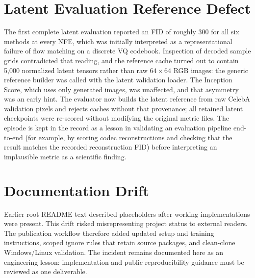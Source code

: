\section{Latent Evaluation Reference Defect}

The first complete latent evaluation reported an FID of roughly 300 for all six
methods at every NFE, which was initially interpreted as a representational
failure of flow matching on a discrete VQ codebook. Inspection of decoded sample
grids contradicted that reading, and the reference cache turned out to contain
5{,}000 normalized latent tensors rather than raw $64\times64$ RGB images:
the generic reference builder was called with the latent validation loader. The
Inception Score, which uses only generated images, was unaffected, and that
asymmetry was an early hint. The evaluator now builds the latent reference from
raw CelebA validation pixels and rejects caches without that provenance; all
retained latent checkpoints were re-scored without modifying the original
metric files. The episode is kept in the record as a lesson in validating an
evaluation pipeline end-to-end (for example, by scoring codec reconstructions
and checking that the result matches the recorded reconstruction FID) before
interpreting an implausible metric as a scientific finding.

\section{Documentation Drift}

Earlier root README text described placeholders after working implementations
were present. This drift risked misrepresenting project status to external
readers. The publication workflow therefore added updated setup and training
instructions, scoped ignore rules that retain source packages, and clean-clone
Windows/Linux validation. The incident remains documented here as an engineering
lesson: implementation and public reproducibility guidance must be reviewed as
one deliverable.
